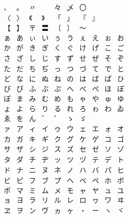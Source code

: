 \documentclass{standalone}
\begin{document}
$\displaystyle
  \begin{array}{cccccccccc}
    、&。&〃&　&々&乄&〇&　&　&　\\
    〈&〉&《&》&「&」&『&』&　&　\\
    【&】&〒&〓&〔&〕&〜&　&　&　\\
    ぁ&あ&ぃ&い&ぅ&う&ぇ&え&ぉ&お\\
    か&が&き&ぎ&く&ぐ&け&げ&こ&ご\\
    さ&ざ&し&じ&す&ず&せ&ぜ&そ&ぞ\\
    た&だ&ち&ぢ&っ&つ&づ&て&で&と\\
    ど&な&に&ぬ&ね&の&は&ば&ぱ&ひ\\
    び&ぴ&ふ&ぶ&ぷ&へ&べ&ぺ&ほ&ぼ\\
    ぽ&ま&み&む&め&も&ゃ&や&ゅ&ゆ\\
    ょ&よ&ら&り&る&れ&ろ&ゎ&わ&ゐ\\
    ゑ&を&ん&゛&゜&ゝ&ゞ&　&　&　\\
    ァ&ア&ィ&イ&ゥ&ウ&ェ&エ&ォ&オ\\
    カ&ガ&キ&ギ&ク&グ&ケ&ゲ&コ&ゴ\\
    サ&ザ&シ&ジ&ス&ズ&セ&ゼ&ソ&ゾ\\
    タ&ダ&チ&ヂ&ッ&ツ&ヅ&テ&デ&ト\\
    ド&ナ&ニ&ヌ&ネ&ノ&ハ&バ&パ&ヒ\\
    ビ&ピ&フ&ブ&プ&ヘ&ベ&ペ&ホ&ボ\\
    ポ&マ&ミ&ム&メ&モ&ャ&ヤ&ュ&ユ\\
    ョ&ヨ&ラ&リ&ル&レ&ロ&ヮ&ワ&ヰ\\
    ヱ&ヲ&ン&ヴ&ヵ&ヶ&・&ー&ヽ&ヾ
  \end{array}
$
\end{document}
